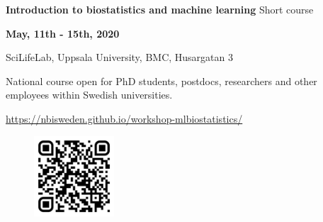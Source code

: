\documentclass[12pt]{article}\usepackage[]{graphicx}\usepackage[]{color}
\begin{document}

\Huge
\textbf{Introduction to biostatistics and machine learning} %
\normalsize
Short course

\LARGE
\vspace{1.5cm}
\begin{flushright} \textbf{May, 11th - 15th, 2020} %

\normalsize
SciLifeLab, Uppsala University, BMC, Husargatan 3 %

\vspace{0.5cm}
National course open for PhD students, postdocs, researchers and other employees within Swedish universities.  

\normalsize
\vspace{0.5cm}
\href{https://nbisweden.github.io/workshop-mlbiostatistics/}{https://nbisweden.github.io/workshop-mlbiostatistics/}

\end{flushright} 

\begin{figure}[H]
\includegraphics[width=3cm, height=3cm, right]{QR-code.png}
\end{figure}



\vspace{0.1cm}
\Large

\large
\vspace{0.2cm}
\end{document}
